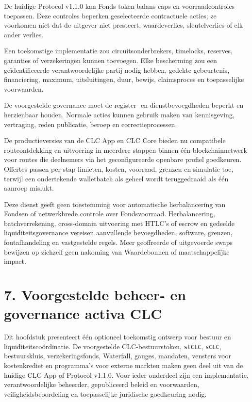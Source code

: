 \documentclass[11pt]{article}
\begin{document}
De huidige Protocol v1.1.0 kan Fonds token-balans caps en voorraadcontroles toepassen. Deze controles beperken geselecteerde contractuele acties; ze voorkomen niet dat de uitgever niet presteert, waardeverlies, sleutelverlies of elk ander verlies.

Een toekomstige implementatie zou circuitsonderbrekers, timelocks, reserves, garanties of verzekeringen kunnen toevoegen. Elke bescherming zou een geïdentificeerde verantwoordelijke partij nodig hebben, gedekte gebeurtenis, financiering, maximum, uitsluitingen, duur, bewijs, claimsproces en toepasselijke voorwaarden.

De voorgestelde governance moet de register- en dienstbevoegdheden beperkt en herzienbaar houden. Normale acties kunnen gebruik maken van kennisgeving, vertraging, reden publicatie, beroep en correctieprocessen.

De productieversies van de CLC App en CLC Core bieden nu compatibele routeontdekking en uitvoering in meerdere stappen binnen één blockchainnetwerk voor routes die deelnemers via het geconfigureerde openbare profiel goedkeuren. Offertes passen per stap limieten, kosten, voorraad, grenzen en simulatie toe, terwijl een ondertekende walletbatch als geheel wordt teruggedraaid als één aanroep mislukt.

Deze dienst geeft geen toestemming voor automatische herbalancering van Fondsen of netwerkbrede controle over Fondsvoorraad. Herbalancering, batchverrekening, cross-domain uitvoering met HTLC's of escrow en gedeelde liquiditeitsgovernance vereisen aanvullende bevoegdheden, software, grenzen, foutafhandeling en vastgestelde regels. Meer geoffreerde of uitgevoerde swaps bewijzen op zichzelf geen nakoming van Waardebonnen of maatschappelijke impact.


\section*{7. Voorgestelde beheer- en governance activa CLC}

Dit hoofdstuk presenteert één optioneel toekomstig ontwerp voor bestuur en liquiditeitscoördinatie. De voorgestelde CLC-bestuurstoken, \texttt{stCLC}, \texttt{sCLC}, bestuurskluis, verzekeringsfonds, Waterfall, gauges, mandaten, vensters voor kostenkrediet en programma's voor externe markten maken geen deel uit van de huidige CLC App of Protocol v1.1.0. Voor ieder onderdeel zijn een implementatie, verantwoordelijke beheerder, gepubliceerd beleid en voorwaarden, veiligheidsbeoordeling en toepasselijke juridische goedkeuring nodig.
\end{document}
